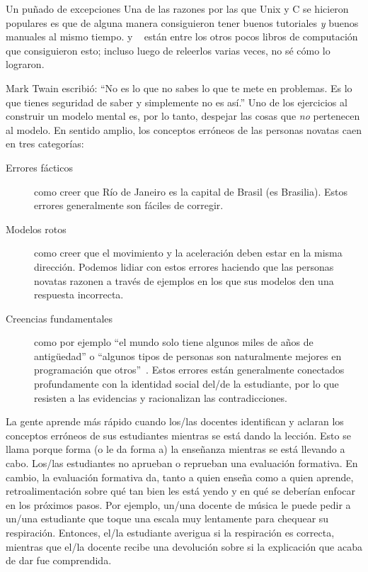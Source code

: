 \begin{aside}{Un puñado de excepciones}
  Una de las razones por las que Unix y C se hicieron populares es que 
  \cite{Kern1978,Kern1983,Kern1988}
  de alguna manera consiguieron tener buenos tutoriales \emph{y} buenos manuales al mismo tiempo.
  \cite{Fehi2008} y ~\cite{Ray2014} están entre los otros pocos libros de computación que consiguieron esto; incluso luego de releerlos varias veces, no sé cómo lo lograron.
\end{aside}


Mark Twain escribió: 
``No es lo que no sabes lo que te mete en problemas.
Es lo que tienes seguridad de saber y simplemente no es así.''
Uno de los ejercicios al construir un modelo mental es, por lo tanto,
despejar las cosas que \emph{no} pertenecen al modelo.
En sentido amplio,
los conceptos erróneos de las personas novatas caen en tres categorías:

\begin{description}

\item[Errores fácticos]
  como creer que Río de Janeiro es la capital de Brasil (es Brasilia).
Estos errores generalmente son fáciles de corregir.

\item[Modelos rotos]
  como creer que el movimiento y la aceleración deben estar en la misma dirección.
Podemos lidiar con estos errores haciendo que las personas novatas razonen a través de ejemplos
en los que sus modelos den una respuesta incorrecta.

\item[Creencias fundamentales]
  como por ejemplo ``el mundo solo tiene algunos miles de años de antigüedad''
  o ``algunos tipos de personas son naturalmente mejores en programación que otros''~\cite{Guzd2015b,Pati2016}.
  Estos errores están generalmente conectados profundamente con la identidad social del/de la estudiante, 
  por lo que resisten a las evidencias y racionalizan las contradicciones.

\end{description}

La gente aprende más rápido cuando los/las docentes identifican y aclaran los conceptos erróneos de sus estudiantes mientras se está dando la lección.
Esto se llama 
porque forma (o le da forma a) la enseñanza mientras se está llevando a cabo.
Los/las estudiantes no aprueban o reprueban una evaluación formativa.
En cambio,
la evaluación formativa da, tanto a quien enseña como a quien aprende, retroalimentación sobre qué tan bien les está yendo y en qué se deberían enfocar en los próximos pasos.
Por ejemplo,
un/una docente de música le puede pedir a un/una estudiante que toque una escala muy lentamente para chequear su respiración.
Entonces, el/la estudiante averigua si la respiración es correcta, mientras que el/la docente recibe una devolución sobre si la explicación que acaba de dar fue comprendida.

